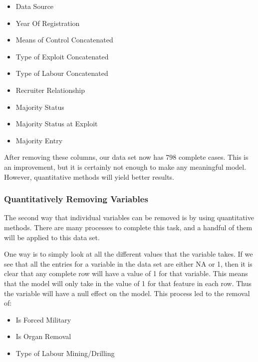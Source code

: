 \documentclass{article} %
\begin{document}
	\begin{multicols}{2}
		\begin{itemize}
		\item Data Source
		\item Year Of Registration
		\item Means of Control Concatenated
		\item Type of Exploit Concatenated
		\item Type of Labour Concatenated
		\item Recruiter Relationship
		\item Majority Status
		\item Majority Status at Exploit
		\item Majority Entry
	\end{itemize}
	\end{multicols}
	
	After removing these columns, our data set now has 798 complete cases. This is an improvement, but it is certainly not enough to make any meaningful model. However, quantitative methods will yield better results.

	
	\subsubsection{Quantitatively Removing Variables}
	
	The second way that individual variables can be removed is by using quantitative methods. There are many processes to complete this task, and a handful of them will be applied to this data set. 
	
	One way is to simply look at all the different values that the variable takes. If we see that all the entries for a variable in the data set are either NA or 1, then it is clear that any complete row will have a value of 1 for that variable. This means that the model will only take in the value of 1 for that feature in each row. Thus the variable will have a null effect on the model. This process led to the removal of:
	

	\begin{multicols}{2}
		\begin{itemize}
			\item Is Forced Military
			\item Is Organ Removal
			\item Type of Labour Mining/Drilling
		\end{itemize}
	\end{multicols}
	
\end{document}
